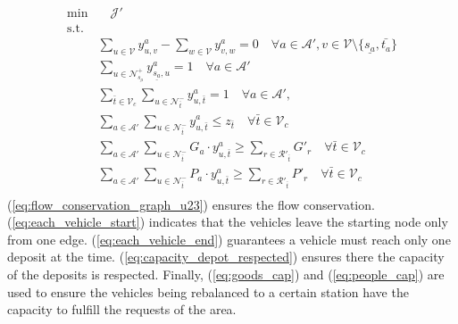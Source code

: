 \begin{align}
	\text{min}&  \quad \mathcal{J'} \nonumber \\
	\text{s.t.} &\nonumber\\
	&\sum_{u \in \mathcal{V}} y^a_{u, v} - \sum_{w \in \mathcal{V}} y^a_{v, w} = 0 \quad \forall a \in \mathcal{A'}, v \in \mathcal{V} \setminus \{\underline{s_a}, \bar{t_a}\} \label{eq:flow_conservation_graph_u23} \\	
	&\sum_{ u \in \mathcal{N}^+_{\underline{s_a}} }y^a_{ \underline{s_a},u} = 1 \quad \forall a \in \mathcal{A'} \label{eq:each_vehicle_start}\\
	&\sum_{\bar{t} \in \mathcal{V}_c}\sum_{ u \in \mathcal{N}^-_{\bar{t}} }y^a_{u, \bar{t}} = 1 \quad \forall a \in \mathcal{A'},  \label{eq:each_vehicle_end}\\
	&\sum_{a \in \mathcal{A'}}\sum_{u \in \mathcal{N}^-_{\bar{t}} } y^a_{u, \bar{t}} \leq z_{\bar{t}} \quad \forall \bar{t} \in \mathcal{V}_c \label{eq:capacity_depot_respected}\\
	&\sum_{a \in \mathcal{A'}}\sum_{u \in \mathcal{N}^-_{\bar{t}} } G_a \cdot y^a_{u, \bar{t}} \ge \sum_{r \in \mathcal{R'}_{\bar{t}}} G'_r \quad \forall \bar{t} \in \mathcal{V}_c \label{eq:goods_cap}\\
	&\sum_{a \in \mathcal{A'}}\sum_{u \in \mathcal{N}^-_{\bar{t}} } P_a \cdot y^a_{u, \bar{t}} \ge \sum_{r \in \mathcal{R'}_{\bar{t}}} P'_r \quad \forall \bar{t} \in \mathcal{V}_c \label{eq:people_cap}\\
	\nonumber%
\end{align}
(\ref{eq:flow_conservation_graph_u23}) ensures the flow conservation. (\ref{eq:each_vehicle_start}) indicates that the vehicles leave the starting node only from one edge. (\ref{eq:each_vehicle_end}) guarantees a vehicle must reach only one deposit at the time. (\ref{eq:capacity_depot_respected}) ensures there the capacity of the deposits is respected. Finally, (\ref{eq:goods_cap}) and (\ref{eq:people_cap}) are used to ensure the vehicles being rebalanced to a certain station have the capacity to fulfill the requests of the area.\\ 
